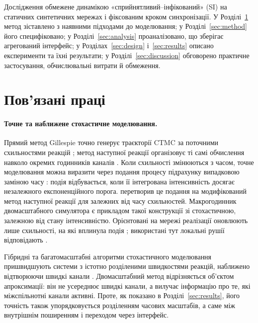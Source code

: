 Дослідження обмежене динамікою «сприйнятливий--інфікований» (SI) на статичних синтетичних мережах і фіксованим кроком синхронізації. У Розділі~\ref{sec:related} метод зіставлено з наявними підходами до моделювання; у Розділі~\ref{sec:method} його специфіковано; у Розділі~\ref{sec:analysis} проаналізовано, що зберігає агрегований інтерфейс; у Розділах~\ref{sec:design} і~\ref{sec:results} описано експерименти та їхні результати; у Розділі~\ref{sec:discussion} обговорено практичне застосування, обчислювальні витрати й обмеження.

\section{Пов'язані праці}
\label{sec:related}

\paragraph{Точне та наближене стохастичне моделювання.}
Прямий метод Gillespie точно генерує траєкторії CTMC за поточними схильностями реакцій \citep{gillespie1977exact}; метод наступної реакції організовує ті самі обчислення навколо окремих годинників каналів \citep{gibson2000}. Коли схильності змінюються з часом, точне моделювання можна виразити через подання процесу підрахунку випадковою заміною часу \citep{ethier1986}: подія відбувається, коли її інтегрована інтенсивність досягає незалежного експоненційного порога. \citet{anderson2007} перетворив це подання на модифікований метод наступної реакції для залежних від часу схильностей. Макрогодинник двомасштабного симулятора є прикладом такої конструкції зі стохастичною, залежною від стану інтенсивністю. Орієнтовані на мережі реалізації оновлюють лише схильності, на які вплинула подія \citep{vestergaard2015,kuryliak2025simulating}; використані тут локальні рушії відповідають \citet{kuryliak2025simulating}.

Гібридні та багатомасштабні алгоритми стохастичного моделювання пришвидшують системи з істотно розділеними швидкостями реакцій, наближено відтворюючи швидкі канали \citep{haseltine2002,cao2005slow}. Двомасштабний метод відрізняється об'єктом апроксимації: він не усереднює швидкі канали, а вилучає інформацію про те, які міжспільнотні канали активні. Проте, як показано в Розділі~\ref{sec:results}, його точність також упорядковується розділенням часових масштабів, а саме між внутрішнім поширенням і переходом через інтерфейс.


